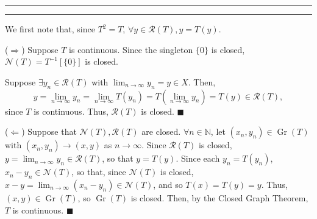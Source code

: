 \documentclass[11pt]{article}
\newcounter{questionCounter}
\newcounter{partCounter}[questionCounter]
\newenvironment{question}[2][\arabic{questionCounter}]{%
    \setcounter{partCounter}{0}%
    \vspace{.25in} \hrule \vspace{0.5em}%
        \noindent{\bf #2}%
    \vspace{0.8em} \hrule \vspace{.10in}%
    \addtocounter{questionCounter}{1}%
}{}
\renewcommand{\qed}{\quad $\blacksquare$}
\newcommand{\inv}{^{-1}}
\newcommand{\Gr}{\operatorname{Gr}} %
\newcommand{\N}{\mathbb{N}} %
\newcommand{\Ran}{\mathcal{R}} %
\newcommand{\Nul}{\mathcal{N}} %
\begin{document}
\begin{question}{Problem 5}
We first note that, since $T^2 = T$, $\forall y \in \Ran(T), y = T(y)$.

($\Rightarrow$) Suppose $T$ is continuous. Since the singleton $\{0\}$ is
closed, $\Nul(T) = T\inv[\{0\}]$ is closed.

Suppose $\exists y_n \in \Ran(T)$ with
$\lim_{n \rightarrow \infty} y_n = y \in X$. Then,
\[y
    = \lim_{n \rightarrow \infty} y_n
    = \lim_{n \rightarrow \infty} T(y_n)
    = T\left(\lim_{n \rightarrow \infty} y_n\right)
    = T(y) \in \Ran(T),
\]
since $T$ is continuous. Thus, $\Ran(T)$ is closed. \qed

($\Leftarrow$) Suppose that $\Nul(T),\Ran(T)$ are closed. $\forall n \in \N$,
let $(x_n,y_n) \in \Gr(T)$ with $(x_n,y_n) \rightarrow (x,y)$ as
$n \rightarrow \infty$. Since $\Ran(T)$ is closed,
$y = \lim_{n \rightarrow \infty} y_n \in \Ran(T)$, so that $y = T(y)$. Since
each $y_n = T(y_n)$, $x_n - y_n \in \Nul(T)$, so that, since $\Nul(T)$ is
closed, $x - y = \lim_{n \rightarrow \infty} (x_n - y_n) \in \Nul(T)$, and so
$T(x) = T(y) = y$. Thus, $(x,y) \in \Gr(T)$, so $\Gr(T)$ is closed. Then, by
the Closed Graph Theorem, $T$ is continuous. \qed
\end{question}
\end{document}
